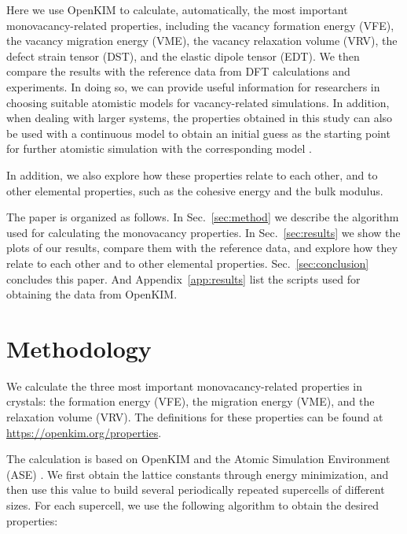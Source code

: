 \documentclass[%
 reprint,
 amsmath,amssymb,
 aps,
]{revtex4-1}
\begin{document}
Here we use OpenKIM to calculate, automatically, the most important monovacancy-related properties, including the vacancy formation energy (VFE), the vacancy migration energy (VME), the vacancy relaxation volume (VRV), the defect strain tensor (DST), and the elastic dipole tensor (EDT).
We then compare the results with the reference data from DFT calculations and experiments.
In doing so, we can provide useful information for researchers in choosing suitable atomistic models for vacancy-related simulations.
In addition, when dealing with larger systems, the properties obtained in this study can also be used with a continuous model to obtain an initial guess as the starting point for further atomistic simulation with the corresponding model \cite{bozhevolnyi2001multiple}.

In addition, we also explore how these properties relate to each other, and to other elemental properties, such as the cohesive energy and the bulk modulus.

The paper is organized as follows.
In Sec.~\ref{sec:method} we describe the algorithm used for calculating the monovacancy properties.
In Sec.~\ref{sec:results} we show the plots of our results, compare them with the reference data, and explore how they relate to each other and to other elemental properties.
Sec.~\ref{sec:conclusion} concludes this paper.
And Appendix~\ref{app:results} list the scripts used for obtaining the data from OpenKIM.

\section{\label{sec:method}Methodology}

We calculate the three most important monovacancy-related properties in crystals: the formation energy (VFE), the migration energy (VME), and the relaxation volume (VRV).
The definitions for these properties can be found at \url{https://openkim.org/properties}.

The calculation is based on OpenKIM and the Atomic Simulation Environment (ASE) \cite{bahn2002object}.
We first obtain the lattice constants through energy minimization, and then use this value to build several periodically repeated supercells of different sizes.
For each supercell, we use the following algorithm to obtain the desired properties:
\end{document}
